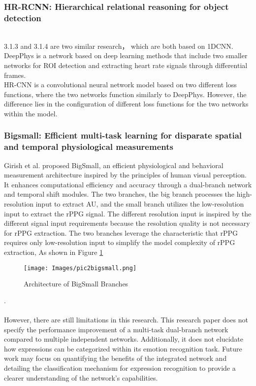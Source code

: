 \documentclass[a4paper]{article}
\begin{document}
\subsubsection{HR-RCNN: Hierarchical relational reasoning for object detection}

\\3.1.3 and 3.1.4 are two similar research， which are both based on 1DCNN.
\\DeepPhys is a network based on deep learning methods that include two smaller networks for ROI detection and extracting heart rate signals through differential frames\cite{chen2018deepphys}.
\\HR-CNN is a convolutional neural network model based on two different loss functions, where the two networks function similarly to DeepPhys. However, the difference lies in the configuration of different loss functions for the two networks within the model\cite{chen2021hr}.

\subsubsection{Bigsmall: Efficient multi-task learning for disparate spatial and temporal physiological measurements}
Girish et al. proposed BigSmall, an efficient physiological and behavioral measurement architecture inspired by the principles of human visual perception. It enhances computational efficiency and accuracy through a dual-branch network and temporal shift modules. The two branches, the big branch processes the high-resolution input to extract AU, and the small branch utilizes the low-resolution input to extract the rPPG signal. The different resolution input is inspired by the different signal input requirements because the resolution quality is not necessary for rPPG extraction. The two branches leverage the characteristic that rPPG requires only low-resolution input to simplify the model complexity of rPPG extraction, As shown in Figure \ref{Architecture of BigSmall Branches}
\begin{figure}[htbp]
    \centering
    \texttt{[image: Images/pic2bigsmall.png]}
    \caption{Architecture of BigSmall Branches}
    \label{Architecture of BigSmall Branches}
\end{figure}\cite{narayanswamy2024bigsmall}.\\
\\However, there are still limitations in this research. This research paper does not specify the performance improvement of a multi-task dual-branch network compared to multiple independent networks. Additionally, it does not elucidate how expressions can be categorized within its emotion recognition task. Future work may focus on quantifying the benefits of the integrated network and detailing the classification mechanism for expression recognition to provide a clearer understanding of the network's capabilities.
\end{document}
